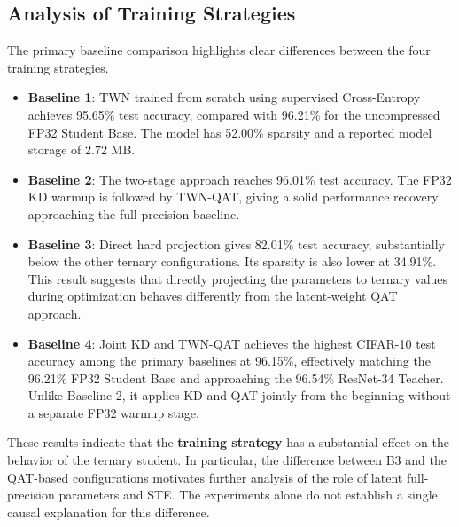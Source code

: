 \documentclass[conference]{IEEEtran}
\begin{document}

\subsection{Analysis of Training Strategies}

The primary baseline comparison highlights clear differences between
the four training strategies.

\begin{itemize}

    \item \textbf{Baseline 1}: TWN trained from scratch using supervised
    Cross-Entropy achieves 95.65\% test accuracy, compared with 96.21\%
    for the uncompressed FP32 Student Base. The model has 52.00\%
    sparsity and a reported model storage of 2.72 MB.

    \item \textbf{Baseline 2}: The two-stage approach reaches 96.01\%
    test accuracy. The FP32 KD warmup is followed by TWN-QAT, giving
    a solid performance recovery approaching the full-precision baseline.

    \item \textbf{Baseline 3}: Direct hard projection gives 82.01\%
    test accuracy, substantially below the other ternary
    configurations. Its sparsity is also lower at 34.91\%. This result
    suggests that directly projecting the parameters to ternary values
    during optimization behaves differently from the latent-weight
    QAT approach.

    \item \textbf{Baseline 4}: Joint KD and TWN-QAT achieves the highest
    CIFAR-10 test accuracy among the primary baselines at 96.15\%,
    effectively matching the 96.21\% FP32 Student Base and approaching
    the 96.54\% ResNet-34 Teacher. Unlike Baseline 2, it applies KD and
    QAT jointly from the beginning without a separate FP32 warmup stage.

\end{itemize}

These results indicate that the \textbf{training strategy} has a
substantial effect on the behavior of the ternary student. In
particular, the difference between B3 and the QAT-based configurations
motivates further analysis of the role of latent full-precision
parameters and STE. The experiments alone do not establish a single
causal explanation for this difference.
\end{document}
